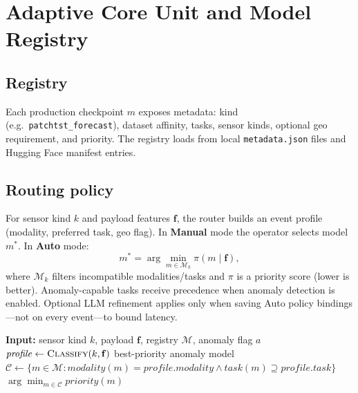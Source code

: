 

\section{Adaptive Core Unit and Model Registry}

\subsection{Registry}

Each production checkpoint $m$ exposes metadata: kind (e.g.\ \texttt{patchtst\_forecast}), dataset affinity, tasks, sensor kinds, optional geo requirement, and priority. The registry loads from local \texttt{metadata.json} files and Hugging Face manifest entries.

\subsection{Routing policy}

For sensor kind $k$ and payload features $\mathbf{f}$, the router builds an event profile (modality, preferred task, geo flag). In \textbf{Manual} mode the operator selects model $m^{*}$. In \textbf{Auto} mode:
\begin{equation}
m^{*} = \arg\min_{m \in \mathcal{M}_k} \pi(m \mid \mathbf{f}),
\end{equation}
where $\mathcal{M}_k$ filters incompatible modalities/tasks and $\pi$ is a priority score (lower is better). Anomaly-capable tasks receive precedence when anomaly detection is enabled. Optional LLM refinement applies only when saving Auto policy bindings---not on every event---to bound latency.

\begin{algorithm}[H]
\caption{Rule-based model routing (Auto mode)}
\begin{algorithmic}[1]
\State \textbf{Input:} sensor kind $k$, payload $\mathbf{f}$, registry $\mathcal{M}$, anomaly flag $a$
\State $\mathit{profile} \gets \textsc{Classify}(k, \mathbf{f})$
  \State \Return best-priority anomaly model
\EndIf
\State $\mathcal{C} \gets \{ m \in \mathcal{M} : \mathit{modality}(m)=\mathit{profile.modality} \land \mathit{task}(m)\supseteq \mathit{profile.task}\}$
\State \Return $\arg\min_{m\in\mathcal{C}} \mathit{priority}(m)$
\end{algorithmic}
\end{algorithm}

